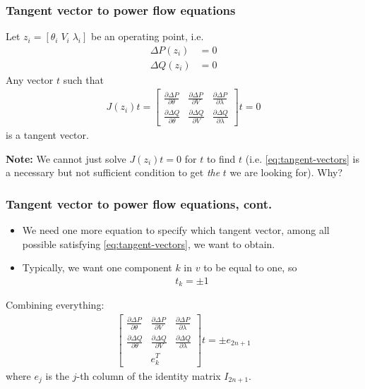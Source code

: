 \documentclass{beamer}
\begin{document}
\begin{frame}
  \frametitle{Tangent vector to power flow equations}
  Let $z_i = [\theta_i \; V_i \; \lambda_{i}]$ be an operating point, i.e.
  \begin{align}
    \label{eq:7}
    \Delta P (z_i) &= 0 \\
    \Delta Q (z_i) &= 0
  \end{align}
Any vector $t$ such that
\begin{align}
  \label{eq:tangent-vectors}
  J(z_i)t = \begin{bmatrix}
  \frac{\partial \Delta P}{\partial \theta} & \frac{\partial \Delta P}{\partial V} & \frac{\partial \Delta P}{\partial \lambda} \\
  \frac{\partial \Delta Q}{\partial \theta} & \frac{\partial \Delta Q}{\partial V} & \frac{\partial \Delta Q}{\partial \lambda}
  \end{bmatrix} t = 0
\end{align}
is a tangent vector.

\textbf{Note:} We cannot just solve $J(z_i) t = 0$ for $t$ to find $t$ (i.e. \eqref{eq:tangent-vectors} is a necessary but not sufficient condition to get \emph{the} $t$ we are looking for). Why? 
\end{frame}

\begin{frame}
  \frametitle{Tangent vector to power flow equations, cont.}
  \begin{itemize}
  \item We need one more equation to specify which tangent vector, among all possible satisfying \eqref{eq:tangent-vectors}, we want to obtain.
  \item Typically, we want one component $k$ in $v$ to be equal to one, so 
    \begin{align}
      \label{eq:10}
      t_k = \pm 1
    \end{align}
  \end{itemize}
 Combining everything:
\begin{align}
  \begin{bmatrix}
  \frac{\partial \Delta P}{\partial \theta} & \frac{\partial \Delta P}{\partial V} & \frac{\partial \Delta P}{\partial \lambda} \\
  \frac{\partial \Delta Q}{\partial \theta} & \frac{\partial \Delta Q}{\partial V} & \frac{\partial \Delta Q}{\partial \lambda} \\
   & e_k^T & 
  \end{bmatrix} t = \pm e_{2n+1}
\end{align}
where $e_j$ is the $j$-th column of the identity matrix $I_{2n+1}$.
\end{frame}
\end{document}
